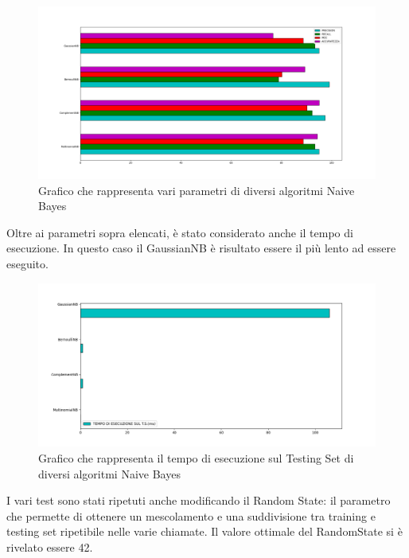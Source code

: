 \documentclass{report}
\begin{document}
  
        \begin{figure}[h]
            \centering
            \includegraphics[width =\textwidth]{immagini/graficoBuono.png}
            \caption{Grafico che rappresenta vari parametri di diversi algoritmi Naive Bayes}

        \end{figure}
        
        Oltre ai parametri sopra elencati, è stato considerato anche il tempo di esecuzione.
        In questo caso il GaussianNB è risultato essere il più lento ad essere eseguito.
        \newpage
        
        \begin{figure}[h]
            \centering
            \includegraphics[width =\textwidth]{immagini/graficoEsecuzione.png}
            \caption{Grafico che rappresenta il tempo di esecuzione sul Testing Set di diversi algoritmi Naive Bayes}
        \end{figure}

    I vari test sono stati ripetuti anche modificando il Random State: il parametro che permette di ottenere un mescolamento e 
    una suddivisione tra training e testing set ripetibile nelle varie chiamate.
    Il valore ottimale del RandomState si è rivelato essere 42.
    
\end{document}
